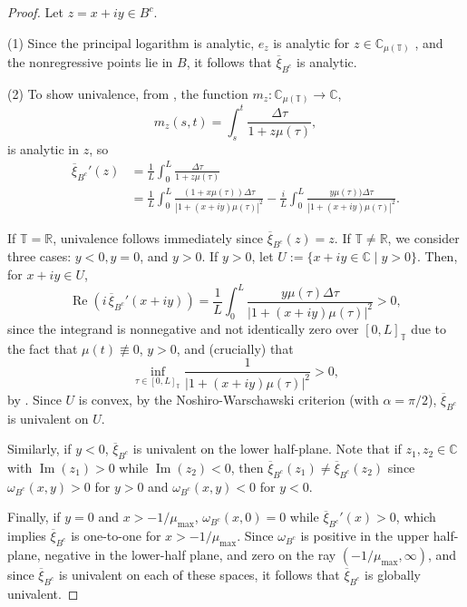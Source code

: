 \documentclass[10pt,a4paper]{amsart}
\DeclareMathOperator{\myRe}{Re}
\DeclareMathOperator{\myIm}{Im}
\numberwithin{equation}{section}
\begin{document}
\begin{proof}
Let $z=x+iy\in B^c$.

(1) Since the principal logarithm is analytic, $e_{z}$ is analytic for
$z \in \mathbb{C}_{\mu(\mathbb{T})}$ \cite{Ka}, and the nonregressive points lie in $B$,
it follows that $\overline{\xi}_{B^c}$ is analytic.

(2) To show univalence, from \cite{Ka}, the function $m_z:\mathbb{C}_{\mu(\mathbb{T})} \to \mathbb{C}$,
$$
m_z(s,t) = \int_{s}^{t} \frac{\Delta \tau}{1+z\mu(\tau)},
$$
is analytic in $z$, so
\begin{equation}
\begin{aligned}
\overline{\xi}_{B^c}'(z)
& = \frac{1}{L} \int_{0}^{L} \frac{\Delta \tau}{1+z \mu(\tau)}  \\
& = \frac{1}{L} \int_{0}^{L} \frac{(1+x \mu(\tau))\Delta \tau}{|1+(x+iy)\mu(\tau)|^2}
- \frac{i}{L} \int_{0}^{L} \frac{y \mu(\tau))\Delta \tau}{|1+(x+iy)\mu(\tau)|^2}.
\end{aligned} \label{calc}
\end{equation}

If $\mathbb{T}=\mathbb{R}$, univalence follows immediately since $\overline{\xi}_{B^c}(z) = z$.
If $\mathbb{T}\not=\mathbb{R}$, we consider three cases: $y<0,y=0$, and $y>0$. If $y>0$, let
$U := \{x+iy \in \mathbb{C} \mid y>0 \}$. Then, for $x+iy \in U$,
 \[
 \myRe(i\,\overline{\xi}_{B^c}'(x+iy))
  = \frac{1}{L} \int_{0}^{L} \frac{y \mu(\tau)\Delta \tau}{|1+(x+iy)\mu(\tau)|^2}>0,
 \]
since the integrand is nonnegative and not identically zero over $[0,L]_{\mathbb{T}}$ due to
the fact that $\mu(t) \not \equiv 0$, $y>0$, and (crucially) that
 $$
 \inf_{\tau \in [0,L]_{\mathbb{T}}} \frac{1}{|1+(x+iy) \mu(\tau)|^2} >0,
 $$
by \cite[Lemma 2.1]{Ka}. Since $U$ is convex, by the Noshiro-Warschawski criterion
(with $\alpha=\pi/2$), $\overline{\xi}_{B^c}$ is univalent on $U$.

Similarly, if $y<0$, $\overline{\xi}_{B^c}$ is univalent on the lower half-plane.
Note that if $z_1, z_2 \in \mathbb{C}$ with $\myIm(z_1)>0$ while $\myIm(z_2)<0$, then
$\overline{\xi}_{B^c}(z_1) \neq \overline{\xi}_{B^c}(z_2)$ since $\omega_{B^c}(x,y)>0$ for $y>0$
and $\omega_{B^c}(x,y)<0$ for $y<0$.

 Finally, if $y=0$ and $x> -1/\mu_{\max}$, $\omega_{B^c}(x,0) =0$ while
$\overline{\xi}_{B^c}'(x)>0$, which implies $\overline{\xi}_{B^c}$ is one-to-one for $x>-1/\mu_{\max}$.
Since $\omega_{B^c}$ is positive in the upper half-plane, negative in the lower-half
plane, and zero on the ray $(-1/\mu_{\max},\infty)$, and since $\overline{\xi}_{B^c}$ is
univalent on each of these spaces, it follows that $\overline{\xi}_{B^c}$ is globally
univalent.
\end{proof}
\end{document}
